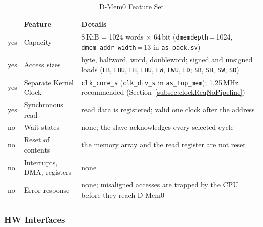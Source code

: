 \begin{table}[H]
\caption{D-Mem0 Feature Set}
\label{tab:asDmemCfg01}
\centering
\begin{tabularx}{\textwidth}{|l |l |X|}
  \hline
   & Feature & Details \\
  \hline
  \hline
  yes & Capacity & 8\,KiB = 1024 words $\times$ 64\,bit
        (\texttt{dmemdepth}\,=\,1024, \texttt{dmem\_addr\_width}\,=\,13 in \texttt{as\_pack.sv}) \\
  \hline
  yes & Access sizes & byte, halfword, word, doubleword; signed and unsigned loads
        (\texttt{LB}, \texttt{LBU}, \texttt{LH}, \texttt{LHU}, \texttt{LW}, \texttt{LWU}, \texttt{LD};
        \texttt{SB}, \texttt{SH}, \texttt{SW}, \texttt{SD}) \\
  \hline
  yes & Separate Kernel Clock & \texttt{clk\_core\_s} (\texttt{clk\_div\_s} in \texttt{as\_top\_mem});
        1.25\,MHz recommended (Section~\ref{subsec:clockReqNoPipeline}) \\
  \hline
  yes & Synchronous read & read data is registered; valid one clock after the address \\
  \hline
  no  & Wait states & none; the slave acknowledges every selected cycle \\
  \hline
  no  & Reset of contents & the memory array and the read register are not reset \\
  \hline
  no  & Interrupts, DMA, registers & none \\
  \hline
  no  & Error response & none; misaligned accesses are trapped by the CPU before they reach D-Mem0 \\
  \hline
\end{tabularx}
\end{table}

\subsubsection{HW Interfaces}

